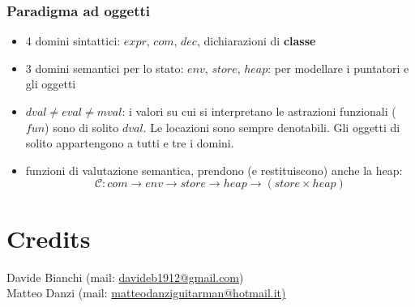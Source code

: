 \documentclass[a4paper, 10pt]{article}
\begin{document}
		\subsubsection{Paradigma ad oggetti}
			\begin{itemize}
				\item 4 domini sintattici: $ expr $, $ com $, $ dec $, dichiarazioni di \textbf{classe}
				\item 3 domini semantici per lo stato: $ env $, $ store $, $ heap $: per modellare i puntatori e gli oggetti
				\item $ dval \neq eval \neq mval $: i valori su cui si interpretano le astrazioni funzionali 
				($ fun $) sono di solito $ dval $. Le locazioni sono sempre denotabili. Gli oggetti di solito appartengono a tutti e tre i domini.
				\item funzioni di valutazione semantica, prendono (e restituiscono)
				anche la heap: 
				\[
					\mathcal{C}: com \to env \to store \to heap \to (store \times heap)
				\]
			\end{itemize}
	\section{Credits}
	Davide Bianchi (mail: \url{davideb1912@gmail.com}) \\
	Matteo Danzi (mail: \url{matteodanziguitarman@hotmail.it)}
	
\end{document}
